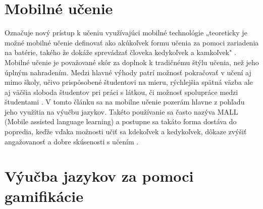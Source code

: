 \documentclass[10pt,slovak,a4paper]{article}
\begin{document}
\section{Mobilné učenie} \label{mobile_learning}

Označuje nový prístup k učeniu využívajúci mobilné technológie „teoreticky je možné mobilné učenie definovať ako akúkoľvek formu učenia za pomoci zariadenia na batérie, takého že dokáže sprevádzať človeka kedykoľvek a kamkoľvek" \cite{deMoraesSarmentoRego2015}.
Mobilné učenie je považované skôr za doplnok k tradičnému štýlu učenia, než jeho úplným nahradením.
Medzi hlavné výhody patrí možnosť pokračovať v učení aj mimo školy, učivo prispôsobené študentovi na mieru, rýchlejšia spätná väzba ale aj väčšia sloboda študentov pri práci s látkou, či možnosť spolupráce medzi študentami \cite{deMoraesSarmentoRego2015}.
V tomto článku sa na mobilne učenie pozerám hlavne z pohľadu jeho využitia na výučbu jazykov. Takéto používanie sa často nazýva MALL (Mobile assisted language learning) a postupne sa takáto forma dostáva do popredia, keďže vďaka možnosti učiť sa kdekoľvek a kedykoľvek, dôkaze zvýšiť angažovanosť a dobre skúsenosti s učením \cite{kukulska2005mobile}.


\section{Výučba jazykov za pomoci gamifikácie} \label{language_learning_gamification_mobile_learning}
\end{document}
